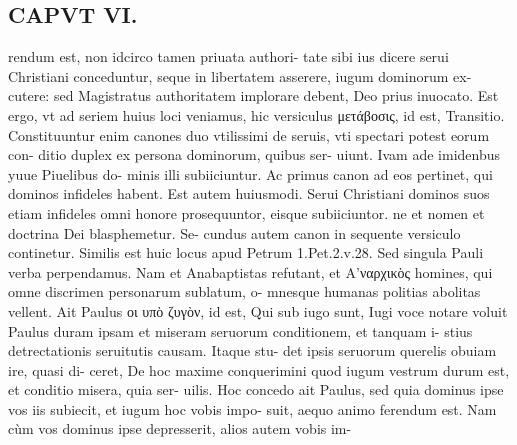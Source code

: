 \documentclass{article}
\begin{document}
\begin{pages}
\section*{CAPVT  VI. }
\marginpar{[ p.41 ]}\pstart rendum est, non idcirco tamen priuata authori- tate sibi ius dicere serui Christiani conceduntur, seque in libertatem asserere, iugum dominorum ex- cutere: sed Magistratus authoritatem implorare debent, Deo prius inuocato. Est ergo, vt ad seriem huius loci veniamus, hic versiculus μετάβοσις, id est, Transitio. Constituuntur enim canones duo vtilissimi de seruis, vti spectari potest eorum con- ditio duplex ex persona dominorum, quibus ser- uiunt. Ivam ade imidenbus yuue Piuelibus do- minis illi subiiciuntur. Ac primus canon ad eos pertinet, qui dominos infideles habent. Est autem huiusmodi.  \pend\pstart Serui Christiani dominos suos etiam infideles omni honore prosequuntor, eisque subiiciuntor. ne et nomen et doctrina Dei blasphemetur. Se- cundus autem canon in sequente versiculo continetur. Similis est huic locus apud Petrum 1.Pet.2.v.28.  \pend\pstart Sed singula Pauli verba perpendamus. Nam et Anabaptistas refutant, et Α’ναρχικὸς homines, qui omne discrimen personarum sublatum, o- mnesque humanas politias abolitas vellent.  \pend\pstart Ait Paulus οι υπὸ ζυγὸν, id est, Qui sub iugo sunt, Iugi voce notare voluit Paulus duram ipsam et miseram seruorum conditionem, et tanquam i- stius detrectationis seruitutis causam. Itaque stu- det ipsis seruorum querelis obuiam ire, quasi di- ceret, De hoc maxime conquerimini quod iugum vestrum durum est, et conditio misera, quia ser- uilis. Hoc concedo ait Paulus, sed quia dominus ipse vos iis subiecit, et iugum hoc vobis impo- suit, aequo animo ferendum est. Nam cùm vos dominus ipse depresserit, alios autem vobis im-  \pend

\end{pages}
\end{document}
